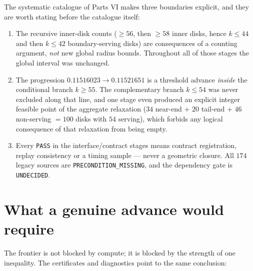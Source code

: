 The systematic catalogue of Parts VI makes three boundaries explicit, and they are worth stating
before the catalogue itself:

\begin{enumerate}[leftmargin=1.6em,itemsep=3pt]
\item The recursive inner-disk counts ($\ge56$, then $\ge58$ inner disks, hence $k\le44$ and then
$k\le42$ boundary-serving disks) are consequences of a counting argument, \emph{not} new global
radius bounds. Throughout all of those stages the global interval was unchanged.
\item The progression $0.11516023\to0.11521651$ is a threshold advance \emph{inside} the conditional
branch $k\ge55$. The complementary branch $k\le54$ was never excluded along that line, and one stage
even produced an explicit integer feasible point of the aggregate relaxation
($34$ near-end $+$ $20$ tail-end $+$ $46$ non-serving $=100$ disks with $54$ serving), which
forbids any logical consequence of that relaxation from being empty.
\item Every \texttt{PASS} in the interface/contract stages means contract registration, replay
consistency or a timing sample --- never a geometric closure. All $174$ legacy sources are
\texttt{PRECONDITION\_\allowbreak{}MISSING}, and the dependency gate is \texttt{UNDECIDED}.
\end{enumerate}

\section{What a genuine advance would require}

The frontier is not blocked by compute; it is blocked by the strength of one inequality. The
certificates and diagnostics point to the same conclusion:

